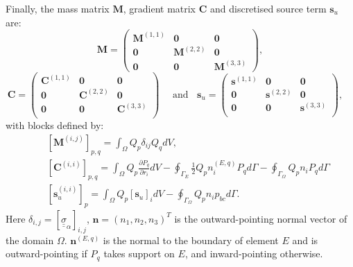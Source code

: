 \documentclass[preprint,authoryear,12pt]{elsarticle}
\begin{document}
Finally, the mass matrix ${\mathbf M}$, gradient matrix
${\mathbf C}$ and discretised source term ${\mathbf s}_{u}$ are:
\[\mathbf{M}=\left(
\begin{array}{ccc}
  \bm{M}^{(1,1)} &\bm{0} &\bm{0} \\
  \bm{0}   &\bm{M}^{(2,2)} &\bm{0} \\
  \bm{0} &\bm{0}  &\bm{M}^{(3,3)}   
\end{array}\right),\]
\[
\bm{C}=\left(
\begin{array}{ccc}
  \bm{C}^{(1,1)}&\bm{0}&\bm{0}\\
  \bm{0}&\bm{C}^{(2,2)}&\bm{0}\\
  \bm{0}&\bm{0}&\bm{C}^{(3,3)}\\
\end{array}\right)\quad \text{ and } \;\;
\bm{s}_u=\left(
\begin{array}{ccc}
  \bm{s}^{(1,1)}&\bm{0}&\bm{0}\\
  \bm{0}&\bm{s}^{(2,2)}&\bm{0}\\
  \bm{0}&\bm{0}&\bm{s}^{(3,3)}\\
\end{array}\right),\quad
\]
with blocks defined by:
\begin{eqnarray}
  && \left[{\mathbf M}^{(i,j)}\right]_{p,q} = \int_{\Omega}  Q_{p} \delta_{ij}
{Q}_{q}  dV, \\
  && {\left[\bm{C}^{(i,i)}\right]_{p,q} = \int_{\Omega} Q_{p} \frac{\partial P_{q}}{\partial r_i} dV - \oint_{\Gamma_{E}} \displaystyle\frac{1}{2} Q_{p} n_i^{(E,q)} P_{q} d\Gamma -  \oint_{\Gamma_{\Omega}} \displaystyle Q_{p} n_i P_{q} d\Gamma} \\
  && {\left[\bm{s}_{u}^{(i,i)}\right]_{p} = \int_{\Omega} Q_p} \left[{\mathbf s}_{u}\right]_i dV - \oint_{\Gamma_{\Omega}}\displaystyle Q_{p} n_i p_{bc} d\Gamma.
\end{eqnarray}
Here $\delta_{i,j} = \left[\underline{\underline{\sigma}}_{\alpha}\right]_{i,j}$,  $\bm{n}=\left(n_{1},n_{2},n_{3}\right)^{T}$ is the outward-pointing normal vector of the domain $\Omega$. $\bm{n}^{(E,q)}$ is the normal to the boundary of element $E$ and is outward-pointing if $P_{q}$ takes support on $E$, and inward-pointing otherwise. 

\medskip
\end{document}
